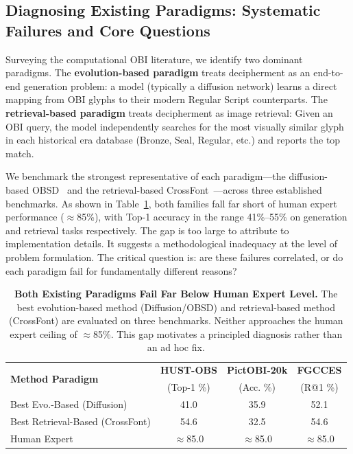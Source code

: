 \documentclass{article}
\begin{document}
\subsection{Diagnosing Existing Paradigms: Systematic Failures and Core Questions}
\label{sec:pre:s1}

Surveying the computational OBI literature, we identify two dominant paradigms. The \textbf{evolution-based paradigm} treats decipherment as an end-to-end generation problem: a model (typically a diffusion network) learns a direct mapping from OBI glyphs to their modern Regular Script counterparts. The \textbf{retrieval-based paradigm} treats decipherment as image retrieval: Given an OBI query, the model independently searches for the most visually similar glyph in each historical era database (Bronze, Seal, Regular, etc.) and reports the top match.

We benchmark the strongest representative of each paradigm—the diffusion-based OBSD~\cite{guan2024deciphering} and the retrieval-based CrossFont~\cite{wu2025cross}—across three established benchmarks. As shown in Table~\ref{tab:pre:p1}, both families fall far short of human expert performance ($\approx$85\%), with Top-1 accuracy in the range 41\%–55\% on generation and retrieval tasks respectively. The gap is too large to attribute to implementation details. It suggests a methodological inadequacy at the level of problem formulation. The critical question is: are these failures correlated, or do each paradigm fail for fundamentally different reasons?

\begin{table}[h]
  \centering
  \caption{\textbf{Both Existing Paradigms Fail Far Below Human Expert Level.} The best evolution-based method (Diffusion/OBSD) and retrieval-based method (CrossFont) are evaluated on three benchmarks. Neither approaches the human expert ceiling of $\approx$85\%. This gap motivates a principled diagnosis rather than an ad hoc fix.}
  \label{tab:pre:p1}
  \begin{tabular}{lccc}
    \toprule
    \multirow{2}{*}{\textbf{Method Paradigm}} & \textbf{HUST-OBS} & \textbf{PictOBI-20k} & \textbf{FGCCES} \\
    & (Top-1 \%) & (Acc. \%) & (R@1 \%) \\
    \midrule
    Best Evo.-Based (Diffusion) & 41.0 & 35.9 & 52.1 \\
    Best Retrieval-Based (CrossFont) & 54.6 & 32.5 & 54.6 \\
    \midrule
    Human Expert & $\approx$85.0 & $\approx$85.0 & $\approx$85.0 \\
    \bottomrule
  \end{tabular}
\end{table}
\end{document}
